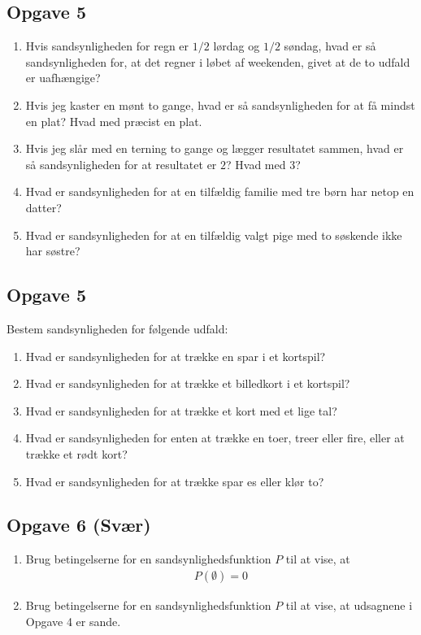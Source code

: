 \subsection*{Opgave 5}
\begin{enumerate}[label=\roman*)]
\item Hvis sandsynligheden for regn er $1/2$ lørdag og $1/2$ søndag, hvad er så sandsynligheden for, at det regner i løbet af weekenden, givet at de to udfald er uafhængige?
\item Hvis jeg kaster en mønt to gange, hvad er så sandsynligheden for at få mindst en plat? Hvad med præcist en plat.
\item Hvis jeg slår med en terning to gange og lægger resultatet sammen, hvad er så sandsynligheden for at resultatet er $2$? Hvad med $3$?
\item Hvad er sandsynligheden for at en tilfældig familie med tre børn har netop en datter?
\item Hvad er sandsynligheden for at en tilfældig valgt pige med to søskende ikke har søstre?
\end{enumerate}

\subsection*{Opgave 5}
Bestem sandsynligheden for følgende udfald:
\begin{enumerate}[label=\roman*)]
	\item Hvad er sandsynligheden for at trække en spar i et kortspil?
	\item Hvad er sandsynligheden for at trække et billedkort i et kortspil?
	\item Hvad er sandsynligheden for at trække et kort med et lige tal?
	\item Hvad er sandsynligheden for enten at trække en toer, treer eller fire, eller at trække et rødt kort?
	\item Hvad er sandsynligheden for at trække spar es eller klør to?
\end{enumerate}

\subsection*{Opgave 6 (Svær)}

\begin{enumerate}[label=\roman*)]
	\item Brug betingelserne for en sandsynlighedsfunktion $P$ til at vise, at 
	\begin{align*}
		P(\emptyset) = 0
	\end{align*}
	\item Brug betingelserne for en sandsynlighedsfunktion $P$ til at vise, at udsagnene i Opgave 4 er sande. 
\end{enumerate}
